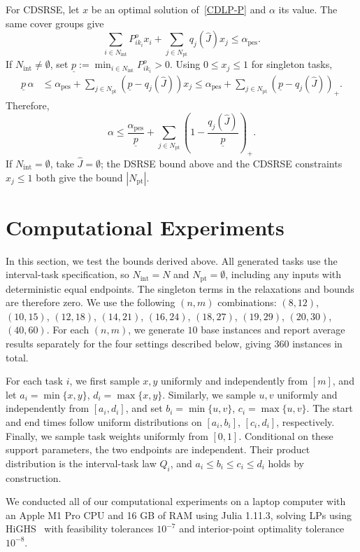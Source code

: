 \documentclass{article}
\DeclareMathOperator{\pes}{pes}
\begin{document}
For CDSRSE, {let $x$ be an optimal solution of~\eqref{CDLP-P} and $\alpha$ its value. The same cover groups give
\[
\sum_{i\in N_{\mathrm{int}}}P_{ik_i}^ox_i+\sum_{j\in N_{\mathrm{pt}}}q_j(\hat{J})x_j\leq\alpha_{\pes}.
\]
If $N_{\mathrm{int}}\neq\emptyset$, set $\underline p:=\min_{i\in N_{\mathrm{int}}}P_{ik_i}^o>0$. Using $0\leq x_j\leq1$ for singleton tasks,
\begin{align*}
\underline p\,\alpha
&\leq\alpha_{\pes}+\sum_{j\in N_{\mathrm{pt}}}(\underline p-q_j(\hat{J}))x_j %
\leq\alpha_{\pes}+\sum_{j\in N_{\mathrm{pt}}}(\underline p-q_j(\hat{J}))_+.
\end{align*}
Therefore,
\[
\alpha\leq\frac{\alpha_{\pes}}{\underline p}
 +\sum_{j\in N_{\mathrm{pt}}}\left(1-\frac{q_j(\hat{J})}{\underline p}\right)_+.
\]
If $N_{\mathrm{int}}=\emptyset$, take $\hat{J}=\emptyset$; the DSRSE bound above and the CDSRSE constraints $x_j\leq1$ both give the bound $|N_{\mathrm{pt}}|$.}

\section{Computational Experiments}

In this section, we test the bounds derived above. {All generated tasks use the interval-task specification, so $N_{\mathrm{int}}=N$ and $N_{\mathrm{pt}}=\emptyset$, including any inputs with deterministic equal endpoints. The singleton terms in the relaxations and bounds are therefore zero.}
We use the following $(n,m)$ combinations: $(8,12)$, $(10,15)$, {$(12,18)$, }$(14,21)$, $(16,24)$, $(18,27)$, $(19,29)$, $(20,30)$, $(40,60)$.
For each $(n,m)$, we generate {$10$ base }instances and report average results {separately for the four settings described below, giving $360$ instances in total}.

For each task $i$, we first sample $x,y$ uniformly and independently from $[m]$, and let $a_i=\min\{x,y\}$, $d_i=\max\{x,y\}$.
Similarly, we sample $u,v$ uniformly and independently from $[a_i,d_i]$, and set $b_i=\min\{u,v\}$, $c_i=\max\{u,v\}$.
The start and end times follow uniform distributions on $[a_i,b_i]$, $[c_i,d_i]$, respectively. Finally, we sample task weights uniformly from $[0,1]$.
{Conditional on these support parameters, the two endpoints are independent. Their product distribution is the interval-task law $Q_i$, and $a_i\leq b_i\leq c_i\leq d_i$ holds by construction.}

We conducted all of our computational experiments on a laptop computer with an Apple M1 Pro CPU and 16 GB of RAM {using Julia 1.11.3}, solving LPs using HiGHS~\cite{HiGHS} with {feasibility tolerances $10^{-7}$ and interior-point optimality tolerance $10^{-8}$}.
\end{document}
